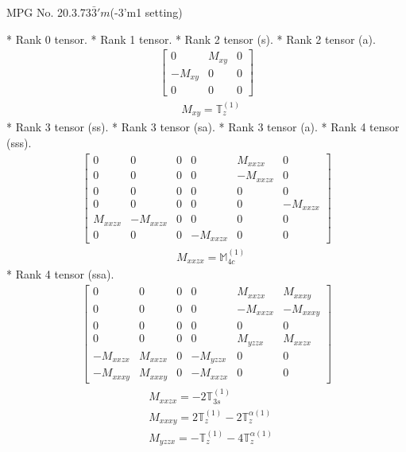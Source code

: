 \documentclass[fleqn,8pt,landscape]{jsarticle}
\begin{document}
\setcounter{MaxMatrixCols}{32}

\renewcommand{\tablename}{Table~}
\renewcommand{\figurename}{Figure~}
\begin{center}
\LARGE
MPG No. 20.3.73\quad$\bar{3}'m$\quad(-3'm1 setting)
\end{center}
* Rank 0 tensor.
* Rank 1 tensor.
* Rank 2 tensor (s).
* Rank 2 tensor (a).
\begin{align*}
\begin{bmatrix} 0 & M_{xy} & 0 \\ - M_{xy} & 0 & 0 \\ 0 & 0 & 0 \end{bmatrix}
\end{align*}
\begin{align*}
& M_{xy} = \mathbb{T}_{z}^{(1)}
\end{align*}
* Rank 3 tensor (ss).
* Rank 3 tensor (sa).
* Rank 3 tensor (a).
* Rank 4 tensor (sss).
\begin{align*}
\begin{bmatrix} 0 & 0 & 0 & 0 & M_{xxzx} & 0 \\ 0 & 0 & 0 & 0 & - M_{xxzx} & 0 \\ 0 & 0 & 0 & 0 & 0 & 0 \\ 0 & 0 & 0 & 0 & 0 & - M_{xxzx} \\ M_{xxzx} & - M_{xxzx} & 0 & 0 & 0 & 0 \\ 0 & 0 & 0 & - M_{xxzx} & 0 & 0 \end{bmatrix}
\end{align*}
\begin{align*}
& M_{xxzx} = \mathbb{M}_{4c}^{(1)}
\end{align*}
* Rank 4 tensor (ssa).
\begin{align*}
\begin{bmatrix} 0 & 0 & 0 & 0 & M_{xxzx} & M_{xxxy} \\ 0 & 0 & 0 & 0 & - M_{xxzx} & - M_{xxxy} \\ 0 & 0 & 0 & 0 & 0 & 0 \\ 0 & 0 & 0 & 0 & M_{yzzx} & M_{xxzx} \\ - M_{xxzx} & M_{xxzx} & 0 & - M_{yzzx} & 0 & 0 \\ - M_{xxxy} & M_{xxxy} & 0 & - M_{xxzx} & 0 & 0 \end{bmatrix}
\end{align*}
\begin{align*}
& M_{xxzx} = - 2 \mathbb{T}_{3s}^{(1)} \\
& M_{xxxy} = 2 \mathbb{T}_{z}^{(1)} - 2 \mathbb{T}_{z}^{\alpha(1)} \\
& M_{yzzx} = - \mathbb{T}_{z}^{(1)} - 4 \mathbb{T}_{z}^{\alpha(1)}
\end{align*}
\end{document}
